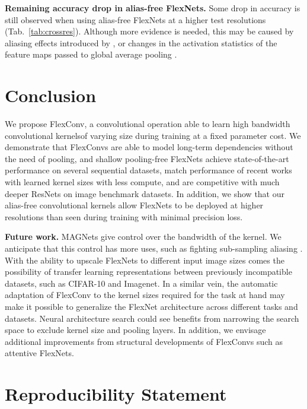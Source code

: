 \documentclass{article} \usepackage{iclr2022_conference,times}
\begin{document}
\textbf{Remaining accuracy drop in alias-free FlexNets.} Some drop in accuracy is still observed when using alias-free FlexNets at a higher test resolutions (Tab.~\ref{tab:crossres}). Although more evidence is needed, this may be caused by aliasing effects introduced by  \citep{vasconcelos2021impact}, or changes in the activation statistics of the feature maps passed to global average pooling \citep{Touvron2019FixingTT}.
\vspace{-2mm}
\section{Conclusion}
\vspace{-2mm}
We propose FlexConv, a convolutional operation able to learn high bandwidth convolutional kernels\break of varying size during training at a fixed parameter cost. We demonstrate that FlexConvs are able to model long-term dependencies without the need of pooling, and shallow pooling-free FlexNets achieve state-of-the-art performance on several sequential datasets, match performance of recent works with learned kernel sizes with less compute, and are competitive with much deeper ResNets on image benchmark datasets. In addition, we show that our alias-free convolutional kernels allow FlexNets to be deployed at higher resolutions than seen during training with minimal precision loss.


\textbf{Future work.} MAGNets give control over the bandwidth of the kernel. We anticipate that this control has more uses, such as fighting sub-sampling aliasing \citep{zhang2019making,Kayhan_2020_CVPR,karras2021alias}. With the ability to upscale FlexNets to different input image sizes comes the possibility of transfer learning representations between previously incompatible datasets, such as CIFAR-10 and Imagenet.
In a similar vein, the automatic adaptation of FlexConv to the kernel sizes required for the task at hand may make it possible to generalize the FlexNet architecture across different tasks and datasets. Neural architecture search \citep{zoph2016neural} could see benefits from narrowing the search space to exclude kernel size and pooling layers. In addition, we envisage additional improvements from structural developments of FlexConvs such as attentive FlexNets.




\section*{Reproducibility Statement}
\end{document}
